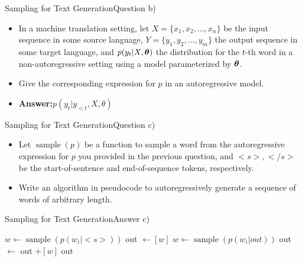 \documentclass[t]{beamer}
\begin{document}
\begin{frame}{Sampling for Text Generation}{Question b)}
    \begin{itemize}
        \item In a machine translation setting, let
              $X = \{x_1, x_2, \ldots, x_n\}$ be the input sequence in some
              source language, $Y = \{y_1, y_2, \ldots, y_m\}$ the output
              sequence in some target language, and $p(y_t|X,{\boldsymbol{\theta}})$ the
              distribution for the $t$-th word in a non-autoregressive setting
              using a model parameterized by ${\boldsymbol{\theta}}$.
        \item Give the corresponding expression for $p$ in an autoregressive
              model.
              \pause
        \item \textbf{Answer:}$p(y_t|y_{<t},X,\theta)$
    \end{itemize}
\end{frame}

\begin{frame}{Sampling for Text Generation}{Question c)}
    \begin{itemize}
        \item Let $\operatorname{sample}(p)$ be a function to sample a word
              from the autoregressive expression for $p$ you provided in the
              previous question, and $<s>, </s>$ be the start-of-sentence and
              end-of-sequence tokens, respectively.
        \item Write an algorithm in pseudocode to autoregressively generate a
              sequence of words of arbitrary length.
    \end{itemize}
\end{frame}

\begin{frame}{Sampling for Text Generation}{Answer c)}
    \begin{algorithmic}
        \STATE $w \leftarrow \operatorname{sample}(p(w_i|<s>))$
        \STATE out $\leftarrow [w]$
        \STATE $w \leftarrow \operatorname{sample}(p(w_i|out))$
        \STATE out $\leftarrow$ out $+ [w]$
        \ENDWHILE
        \RETURN out
    \end{algorithmic}
\end{frame}
\end{document}
